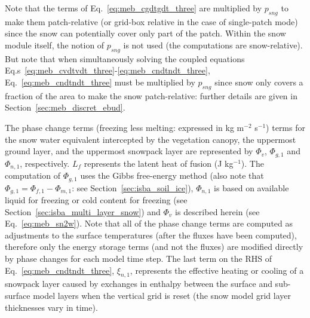 Note that the terms of Eq.~\ref{eq:meb_cgdtgdt_three} are multiplied by
$p_{sng}$ to make them patch-relative (or grid-box relative in the case
of single-patch mode) since the snow can potentially cover only part of the
patch. Within the snow module itself, the notion of
$p_{sng}$ is not used (the computations are snow-relative). 
But note that when simultaneously solving the
coupled equations
Eq.s~\ref{eq:meb_cvdtvdt_three}-\ref{eq:meb_cndtndt_three}, 
Eq.~\ref{eq:meb_cndtndt_three} must be multiplied by $p_{sng}$ since
snow only covers a fraction
of the area to make the snow patch-relative: further details are given
in Section~\ref{sec:meb_discret_ebud}. 

The phase change terms (freezing less melting: expressed in kg m$^{-2}$ s$^{-1}$) 
terms for the snow water equivalent intercepted by the vegetation
canopy, 
the uppermost ground layer, and the uppermost snowpack layer are
represented by
$\Phi_{v}$,  $\Phi_{g,1}$ and $\Phi_{n,1}$, respectively.
$L_f$ represents the latent heat of fusion (J kg$^{-1}$).
%
The computation of $\Phi_{g,1}$ uses the Gibbs free-energy method
(also note that $\Phi_{g,1}=\Phi_{f,1}-\Phi_{m,1}$: see Section~\ref{sec:isba_soil_ice}), 
$\Phi_{n,1}$ is based on available liquid for freezing or cold
content for freezing 
(see Section~\ref{sec:isba_multi_layer_snow})
and $\Phi_{v}$ is described herein (see Eq.~\ref{eq:meb_sn2w}).
%
Note that all of the phase change terms are computed as adjustments
to the surface temperatures (after the fluxes have been computed),
therefore only the energy storage terms (and not the fluxes) 
are modified directly by phase
changes for each model time step.
%
The last term on the RHS of Eq.~\ref{eq:meb_cndtndt_three}, 
$\xi_{n,1}$, represents the effective heating or cooling
of a snowpack layer caused by exchanges in enthalpy between the
surface and sub-surface model
layers 
when the vertical grid is reset (the snow model grid layer thicknesses vary in time). 

